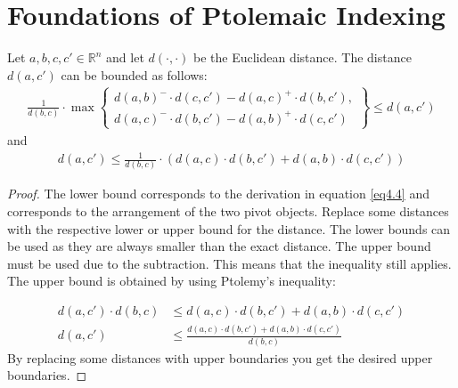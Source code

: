 \section{Foundations of Ptolemaic Indexing}


\begin{theorem}
	\label{thm4.2}
	Let \(a, b, c, c' \in \mathbb{R}^n\) and let \(d(\cdot, \cdot)\) be the Euclidean distance. The distance \(d(a, c')\) can be bounded as follows:
	\begin{gather}
		\frac{1}{d(b, c)} \cdot \max \left\{
		\begin{array}{l}
			d(a, b)^- \cdot d(c, c') - d(a, c)^+ \cdot d(b, c'), \\
			d(a, c)^- \cdot d(b, c') - d(a, b)^+ \cdot d(c, c')
		\end{array}
		\right\} \leq d(a, c')
	\end{gather}
	and
	\begin{gather}
		d(a, c') \leq \frac{1}{d(b, c)} \cdot \left( d(a, c) \cdot d(b, c') + d(a, b) \cdot d(c, c') \right)
	\end{gather}
\end{theorem}
\begin{proof}
	The lower bound corresponds to the derivation in equation \ref{eq4.4} and corresponds to the arrangement of the two pivot objects. Replace some distances with the respective lower or upper bound for the distance. The lower bounds can be used as they are always smaller than the exact distance. The upper bound must be used due to the subtraction. This means that the inequality still applies. The upper bound is obtained by using Ptolemy's inequality:

	\begin{equation*}
		\begin{aligned}
			\label{eq4.7}
			d(a,c') \cdot d(b,c) & \leq d(a, c) \cdot d(b, c') + d(a, b) \cdot d(c, c')                \\
			d(a,c')              & \leq \frac{d(a, c) \cdot d(b, c') + d(a, b) \cdot d(c, c')}{d(b,c)}
		\end{aligned}
	\end{equation*}
	By replacing some distances with upper boundaries you get the desired upper boundaries.
\end{proof}





